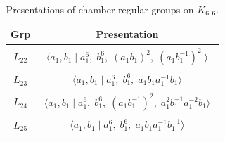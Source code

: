 \documentclass[dvipsnames]{article}
\theoremstyle{definition}
\theoremstyle{remark}
\begin{document}
    \begin{longtable}{ |c|c| }
    \caption{Presentations of chamber-regular groups on $K_{6,6}$.}
    \label{tbl:K66}\\
    \hline
    \textbf{Grp} & \textbf{Presentation} \\
    \hline

    $L_{22}$
    &
    \begin{minipage}{6cm}
        {
        \vspace{-2.5mm}
        \begin{align*}
            \big \langle
            a_1, b_1 \; \big | \;
            a_1^6, \;
            b_1^6, \;
            (a_1 b_1)^2,\;
            (a_1 b_1^{-1})^2\;
            \big \rangle
        \end{align*}
        \vspace{-5mm}
        }
    \end{minipage}\\
    \hline

    $L_{23}$
    &
    \begin{minipage}{6cm}
        {
        \vspace{-2.5mm}
        \begin{align*}
            \big \langle
            a_1, b_1 \; \big | \;
            a_1^6, \;
            b_1^6, \;
            a_1 b_1 a_1^{-1} b_1
            \big \rangle
        \end{align*}
        \vspace{-5mm}
        }
    \end{minipage}\\
    \hline

    $L_{24}$
    &
    \begin{minipage}{6cm}
        {
        \vspace{-2.5mm}
        \begin{align*}
            \big \langle
            a_1, b_1 \; \big | \;
            a_1^6, \;
            b_1^6, \;
            (a_1 b_1^{-1})^2, \;
            a_1^2 b_1^{-1} a_1^{-2} b_1 
            \big \rangle
        \end{align*}
        \vspace{-5mm}
        }
    \end{minipage}\\
    \hline

    $L_{25}$
    &
    \begin{minipage}{6cm}
        {
        \vspace{-2.5mm}
        \begin{align*}
            \big \langle
            a_1, b_1 \; \big | \;
            a_1^6, \;
            b_1^6, \;
            a_1 b_1 a_1^{-1} b_1^{-1}
            \big \rangle
        \end{align*}
        \vspace{-5mm}
        }
    \end{minipage}\\
    \hline


\end{longtable}
\end{document}
